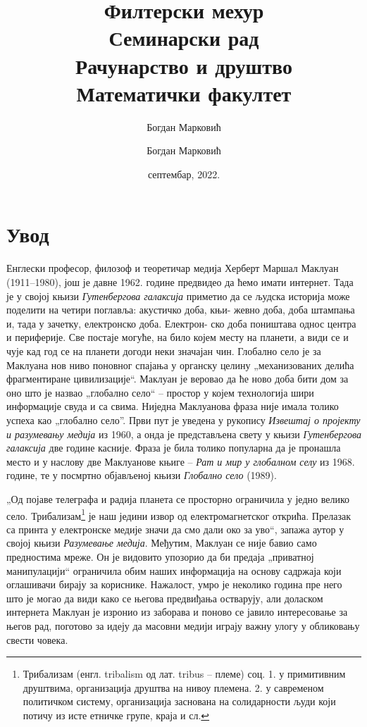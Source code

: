 \documentclass[a4paper]{article}
\author{Богдан Марковић}
\begin{document}
\title{Филтерски мехур\\ 

\bigskip
\small{Семинарски рад
\\Рачунарство и друштво
\\ Математички факултет}}

\author{Богдан Марковић}
\date{септембар, 2022.}
\maketitle



\newpage

\tableofcontents

\newpage

\section{Увод}
\label{sec:uvod}
Енглески професор, филозоф и теоретичар медија Херберт Маршал Маклуан (1911–1980), још је давне 1962. године предвидео да ћемо имати интернет. Тада је у својој књизи \emph{Гутенбергова галаксија} приметио да се људска историја може поделити на четири поглавља: акустичко доба, књи-
жевно доба, доба штампања и, тада у зачетку, електронско доба\cite{macluhan}. Електрон-
ско доба поништава однос центра и периферије. Све постаје могуће, на било којем месту на планети, а види се и чује кад год се на планети догоди неки значајан чин. Глобално село је за Маклуана нов ниво поновног спајања у органску целину „механизованих делића фрагментиране цивилизације“. Маклуан је веровао да ће ново доба бити дом за оно што је назвао „глобално село“ – простор у којем технологија шири информације свуда и са свима. Ниједна Маклуанова фраза није имала толико успеха као „глобално село”. Први пут је уведена у рукопису \emph{Извештај о пројекту и разумевању медија} из 1960, а онда је представљена свету у књизи \emph{Гутенбергова галаксија} две године касније. Фраза је била толико популарна да је пронашла место и у наслову две Маклуанове књиге – \emph{Рат и мир у глобалном селу} из 1968. године, те у посмртно објављеној књизи \emph{Глобално село} (1989).

„Од појаве телеграфа и радија планета се просторно ограничила у једно велико село. Трибализам\footnote{Трибализам (енгл. tribalism од лат. tribus – племе) соц. 1. у примитивним друштвима, организација друштва на нивоу племена. 2. у савременом политичком систему, организација заснована на солидарности људи који потичу из исте етничке групе, краја и
сл.} је наш једини извор од електромагнетског открића. Прелазак са принта у електронске медије значи да смо дали око за уво“, запажа аутор у својој књизи \emph{Разумевање медија}. Међутим, Маклуан се није бавио само предностима мреже. Он је
видовито упозорио да би предаја „приватној манипулацији“ ограничила обим наших информација на основу садржаја који оглашивачи бирају за кориснике. Нажалост, умро је неколико година пре него што је могао да види како се његова предвиђања остварују, али доласком интернета Маклуан је изронио из заборава и поново се јавило интересовање за његов рад, поготово за идеју да масовни медији играју важну улогу у обликовању свести човека.
\end{document}
